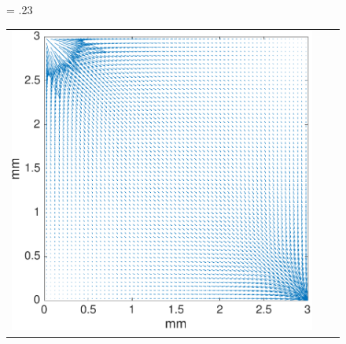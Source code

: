 \documentclass[journal,twocolumn]{IEEEtran}
\newlength{\fwd}
\begin{document}
\begin{figure}[h!tb]
	\centering
	\fwd = .23\textwidth
	\begin{tabular}{c c c}
		\includegraphics[width=\fwd]{figs/qmat.pdf} & 
\end{tabular}
\end{figure}
\end{document}
